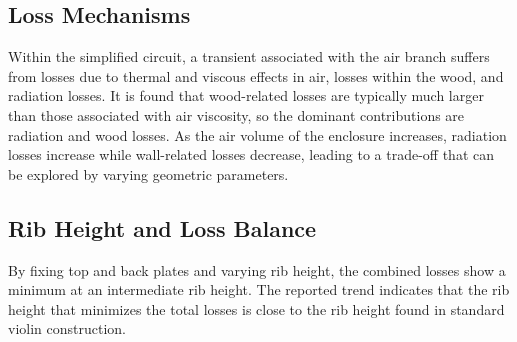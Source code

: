 \subsection{Loss Mechanisms}

Within the simplified circuit, a transient associated with the air branch suffers from losses due to thermal and viscous effects in air, losses within the wood, and radiation losses. It is found that wood-related losses are typically much larger than those associated with air viscosity, so the dominant contributions are radiation and wood losses. As the air volume of the enclosure increases, radiation losses increase while wall-related losses decrease, leading to a trade-off that can be explored by varying geometric parameters. 

\subsection{Rib Height and Loss Balance}

By fixing top and back plates and varying rib height, the combined losses show a minimum at an intermediate rib height. The reported trend indicates that the rib height that minimizes the total losses is close to the rib height found in standard violin construction. 
